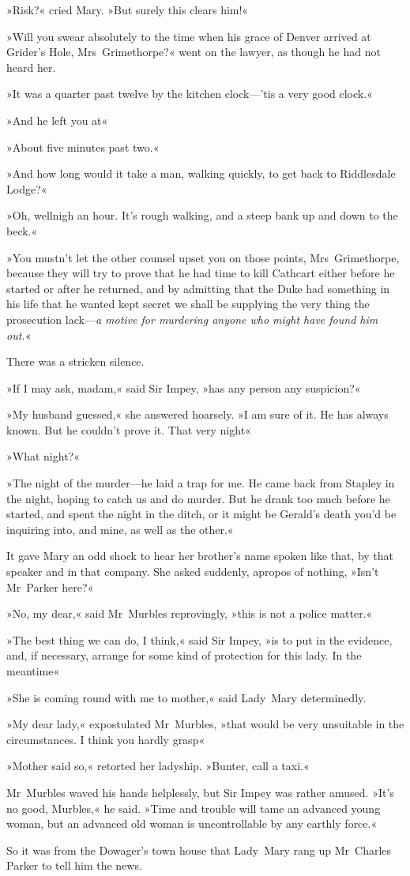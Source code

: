 »Risk?« cried Mary. »But surely this clears him!«

»Will you swear absolutely to the time when his grace of Denver arrived at Grider's Hole, Mrs~Grimethorpe?« went on the lawyer, as though he had not heard her.

»It was a quarter past twelve by the kitchen clock—'tis a very good clock.«

»And he left you at\longdash«

»About five minutes past two.«

»And how long would it take a man, walking quickly, to get back to Riddlesdale Lodge?«

»Oh, wellnigh an hour. It's rough walking, and a steep bank up and down to the beck.«

»You mustn't let the other counsel upset you on those points, Mrs~Grimethorpe, because they will try to prove that he had time to kill Cathcart either before he started or after he returned, and by admitting that the Duke had something in his life that he wanted kept secret we shall be supplying the very thing the prosecution lack—\textit{a motive for murdering anyone who might have found him out.}«

There was a stricken silence.

»If I may ask, madam,« said Sir Impey, »has any person any suspicion?«

»My husband guessed,« she answered hoarsely. »I am sure of it. He has always known. But he couldn't prove it. That very night\longdash«

»What night?«

»The night of the murder—he laid a trap for me. He came back from Stapley in the night, hoping to catch us and do murder. But he drank too much before he started, and spent the night in the ditch, or it might be Gerald's death you'd be inquiring into, and mine, as well as the other.«

It gave Mary an odd shock to hear her brother's name spoken like that, by that speaker and in that company. She asked suddenly, apropos of nothing, »Isn't Mr~Parker here?«

»No, my dear,« said Mr~Murbles reprovingly, »this is not a police matter.«

»The best thing we can do, I think,« said Sir Impey, »is to put in the evidence, and, if necessary, arrange for some kind of protection for this lady. In the meantime\longdash«

»She is coming round with me to mother,« said Lady~Mary determinedly.

»My dear lady,« expostulated Mr~Murbles, »that would be very unsuitable in the circumstances. I think you hardly grasp\longdash«

»Mother said so,« retorted her ladyship. »Bunter, call a taxi.«

Mr~Murbles waved his hands helplessly, but Sir Impey was rather amused. »It's no good, Murbles,« he said. »Time and trouble will tame an advanced young woman, but an advanced old woman is uncontrollable by any earthly force.«

So it was from the Dowager's town house that Lady~Mary rang up Mr~Charles Parker to tell him the news.
